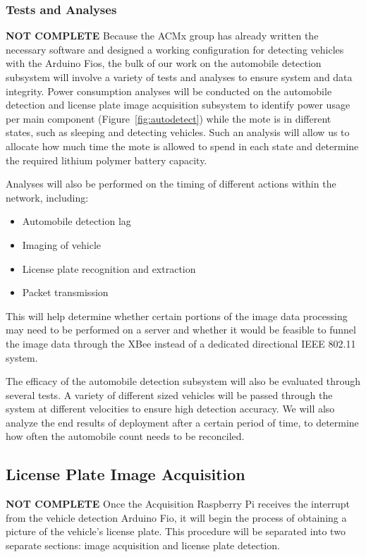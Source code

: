 \documentclass[11pt, oneside, fullpage, doublespace]{article}
\begin{document}
\subsubsection{Tests and Analyses}
{\color{red}\textbf{NOT COMPLETE}}
Because the ACMx group has already written the necessary software and designed a working configuration for detecting vehicles with the Arduino Fios, the bulk of our work on the automobile detection subsystem will involve a variety of tests and analyses to ensure system and data integrity. Power consumption analyses will be conducted on the automobile detection and license plate image acquisition subsystem to identify power usage per main component (Figure~\ref{fig:autodetect}) while the mote is in different states, such as sleeping and detecting vehicles. Such an analysis will allow us to allocate how much time the mote is allowed to spend in each state and determine the required lithium polymer battery capacity.

Analyses will also be performed on the timing of different actions within the network, including:
\begin{itemize}
\item Automobile detection lag
\item Imaging of vehicle
\item License plate recognition and extraction
\item Packet transmission
\end{itemize}
This will help determine whether certain portions of the image data processing may need to be performed on a server and whether it would be feasible to funnel the image data through the XBee instead of a dedicated directional IEEE 802.11 system.

The efficacy of the automobile detection subsystem will also be evaluated through several tests. A variety of different sized vehicles will be passed through the system at different velocities to ensure high detection accuracy. We will also analyze the end results of deployment after a certain period of time, to determine how often the automobile count needs to be reconciled.


\subsection{License Plate Image Acquisition}
{\color{red}\textbf{NOT COMPLETE}}
Once the Acquisition Raspberry Pi receives the interrupt from the vehicle detection Arduino Fio, it will begin the process of obtaining a picture of the vehicle's license plate. This procedure will be separated into two separate sections: image acquisition and license plate detection.
\end{document}
